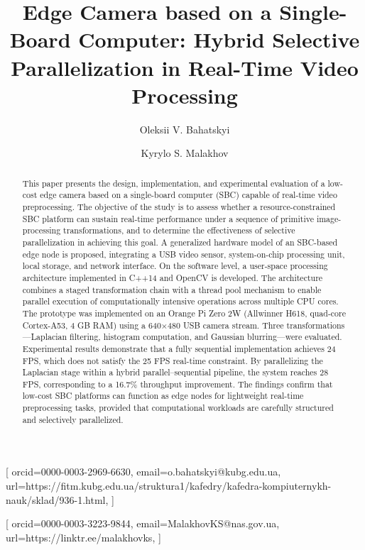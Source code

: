 \documentclass[
]{ceurart}
\begin{document}



\title{Edge Camera based on a Single-Board Computer: Hybrid Selective Parallelization in Real-Time Video Processing}


\author[1,2]{Oleksii V. Bahatskyi}[%
orcid=0000-0003-2969-6630,
email=o.bahatskyi@kubg.edu.ua,
url=https://fitm.kubg.edu.ua/struktura1/kafedry/kafedra-kompiuternykh-nauk/sklad/936-1.html,
]
\cormark[1]

\author[1]{Kyrylo S. Malakhov}[
orcid=0000-0003-3223-9844,
email=MalakhovKS@nas.gov.ua,
url=https://linktr.ee/malakhovks,
]

\address[1]{Glushkov Institute of Cybernetics of the National Academy of Sciences of Ukraine, 40 Glushkov ave., Kyiv, 03187, Ukraine}
\address[2]{Borys Grinchenko Kyiv Metropolitan University, 18/2 Bulvarno-Kudriavska Str, Kyiv, Ukraine, 04053, Kyiv, Ukraine}


\begin{abstract}
  This paper presents the design, implementation, and experimental evaluation of a low-cost edge camera based on a single-board computer (SBC) capable of real-time video preprocessing. The objective of the study is to assess whether a resource-constrained SBC platform can sustain real-time performance under a sequence of primitive image-processing transformations, and to determine the effectiveness of selective parallelization in achieving this goal.  A generalized hardware model of an SBC-based edge node is proposed, integrating a USB video sensor, system-on-chip processing unit, local storage, and network interface. On the software level, a user-space processing architecture implemented in C++14 and OpenCV is developed. The architecture combines a staged transformation chain with a thread pool mechanism to enable parallel execution of computationally intensive operations across multiple CPU cores. The prototype was implemented on an Orange Pi Zero 2W (Allwinner H618, quad-core Cortex-A53, 4 GB RAM) using a 640×480 USB camera stream. Three transformations—Laplacian filtering, histogram computation, and Gaussian blurring—were evaluated. Experimental results demonstrate that a fully sequential implementation achieves 24 FPS, which does not satisfy the 25 FPS real-time constraint. By parallelizing the Laplacian stage within a hybrid parallel–sequential pipeline, the system reaches 28 FPS, corresponding to a 16.7\% throughput improvement. The findings confirm that low-cost SBC platforms can function as edge nodes for lightweight real-time preprocessing tasks, provided that computational workloads are carefully structured and selectively parallelized.
\end{abstract}
\end{document}

